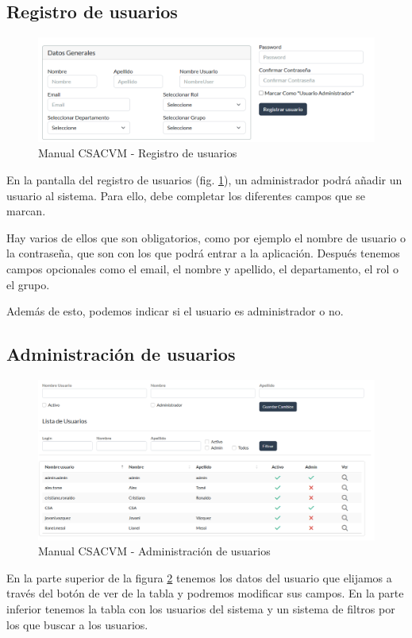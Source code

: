 \subsection{Registro de usuarios}
\begin{figure}
    \centering
    \includegraphics[width=\linewidth]{img/ManualUsuario/Manual21.png}
    \caption{Manual CSACVM - Registro de usuarios}
    \label{manualRegistro}
\end{figure}
En la pantalla del registro de usuarios (fig. \ref{manualRegistro}), un administrador podrá añadir un usuario al sistema.
Para ello, debe completar los diferentes campos que se marcan. 

Hay varios de ellos que son obligatorios, como por ejemplo el nombre de usuario o la contraseña, que son con los que podrá entrar a la aplicación. Después tenemos campos opcionales como el email, el nombre y apellido, el departamento, el rol o el grupo.

Además de esto, podemos indicar si el usuario es administrador o no.

\subsection{Administración de usuarios}
\begin{figure}
    \centering
    \includegraphics[width=\linewidth]{img/ManualUsuario/Manual18.png}
    \caption{Manual CSACVM - Administración de usuarios}
    \label{manualAU}
\end{figure}

En la parte superior de la figura \ref{manualAU} tenemos los datos del usuario que elijamos a través del botón de ver de la tabla y podremos modificar sus campos. En la parte inferior tenemos la tabla con los usuarios del sistema y un sistema de filtros por los que buscar a los usuarios.






